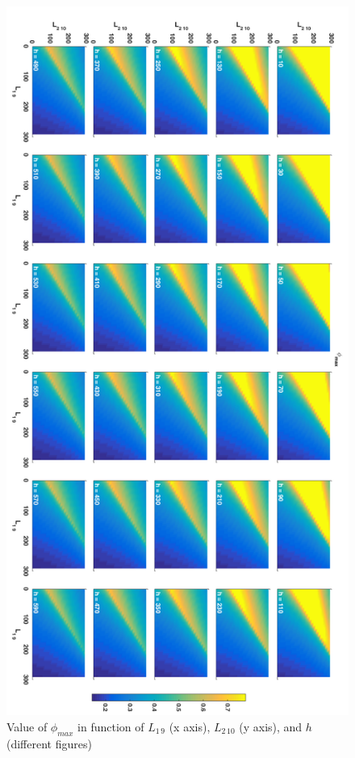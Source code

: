 \begin{figure}
	\includegraphics[width=1.0\linewidth]{figs/05/sim/phimax}
	\caption{Value of $\phi_{max}$ in function of $L_{1\,9}$ (x axis), $L_{2\,10}$ (y axis), and $h$ (different figures)}
	\label{phimax}
\end{figure}

